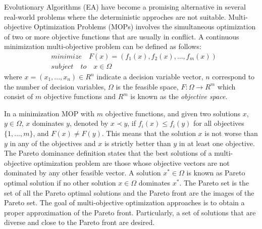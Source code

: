 Evolutionary Algorithms (EA) have become a promising alternative in several real-world problems where the deterministic approches are not suitable.
%
Multi-objective Optimization Problems (MOPs) involves the simultaneous optimization of two or more objective functions that are usually in conflict.
%
A continuous minimization multi-objective problem can be defined as follows:
%
\begin{equation}\label{Base}
\begin{split}
&minimize \quad F(x) = (f_1(x), f_2(x), ..., f_m(x)) \\
&subject \quad to \quad x \in \Omega
\end{split}
\end{equation}
where $x = (x_1, ..., x_n) \in R^n$ indicate a decision variable vector, $n$ correspond to the number of decision variables, $\Omega$ is the feasible space, $F: \Omega \rightarrow R^m$ which consist of $m$ objective functions and $R^m$ is known as the \textit{objective space}.
%

%
In a minimization MOP with $m$ objective functions, and given two solutions $x$, $y \in \Omega$, $x$ dominates $y$, denoted by  $x \prec y$, if $f_i(x) \leq f_i(y)$ for all objectives $\{1, ..., m \}$, and $F(x) \neq F(y)$. 
%
This means that the solution $x$ is not worse than $y$ in any of the objectives and $x$ is strictly better than $y$ in at least one objective.
%
The Pareto dominance definition states that the best solutions of a multi-objective optimization problem are those whose objective vectors are not dominated by any other feasible vector. 
%
A solution $x^* \in \Omega$ is known as Pareto optimal solution if no other solution $x \in \Omega$ dominates $x^*$. 
%
The Pareto set is the set of all the Pareto optimal solutions and the Pareto front are the images of the Pareto set.
%
The goal of multi-objective optimization approaches is to obtain a proper approximation of the Pareto front. 
%
Particularly, a set of solutions that are diverse and close to the Pareto front are desired. 


